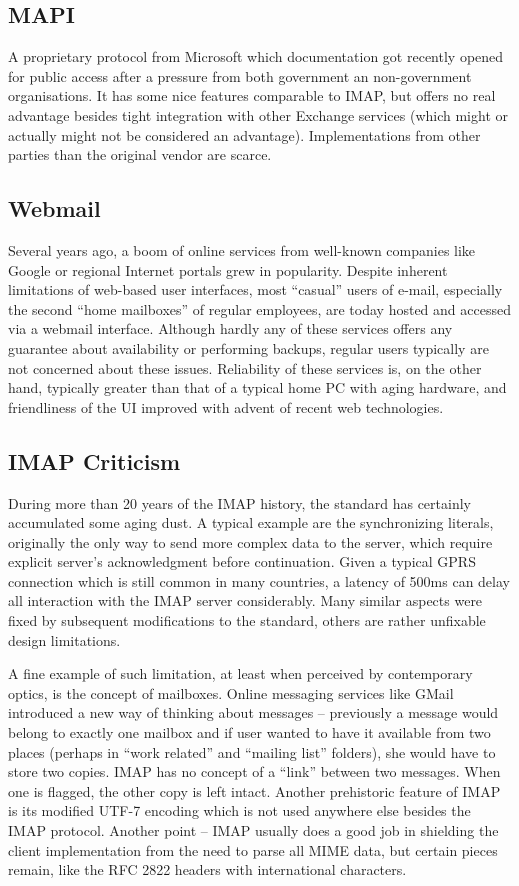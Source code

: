 \documentclass[12pt,notitlepage]{report}
\begin{document}
\subsection{MAPI}

A proprietary protocol from Microsoft which documentation got recently opened
for public access after a pressure from both government an non-government
organisations.  It has some nice features comparable to IMAP, but offers no real
advantage besides tight integration with other Exchange services (which might or
actually might not be considered an advantage).  Implementations from other
parties than the original vendor are scarce.

\subsection{Webmail}

Several years ago, a boom of online services from well-known companies like
Google or regional Internet portals grew in popularity.  Despite inherent
limitations of web-based user interfaces, most ``casual'' users of e-mail,
especially the second ``home mailboxes'' of regular employees, are today hosted
and accessed via a webmail interface.  Although hardly any of these services
offers any guarantee about availability or performing backups, regular users
typically are not concerned about these issues.  Reliability of these services
is, on the other hand, typically greater than that of a typical home PC with
aging hardware, and friendliness of the UI improved with advent of recent
web technologies.

\subsection{IMAP Criticism}

During more than 20 years of the IMAP history, the standard has certainly
accumulated some aging dust.  A typical example are the synchronizing literals,
originally the only way to send more complex data to the server, which require
explicit server's acknowledgment before continuation.  Given a typical GPRS
connection which is still common in many countries, a latency of 500ms can delay
all interaction with the IMAP server considerably.  Many similar aspects were
fixed by subsequent modifications to the standard, others are rather unfixable
design limitations.

A fine example of such limitation, at least when perceived by contemporary
optics, is the concept of mailboxes.  Online messaging services like GMail
introduced a new way of thinking about messages -- previously a message would
belong to exactly one mailbox and if user wanted to have it available from two
places (perhaps in ``work related'' and ``mailing list'' folders), she would
have to store two copies.  IMAP has no concept of a ``link'' between two
messages.  When one is flagged, the other copy is left intact.  Another
prehistoric feature of IMAP is its modified UTF-7 encoding which is not used
anywhere else besides the IMAP protocol.  Another point -- IMAP usually does a
good job in shielding the client implementation from the need to parse all MIME
data, but certain pieces remain, like the RFC 2822 headers with international
characters.
\end{document}
